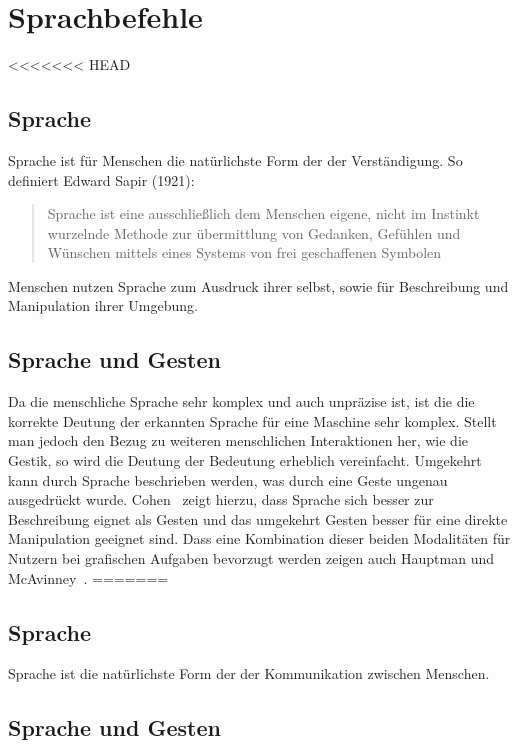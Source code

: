 \chapter{Sprachbefehle}
\label{chap:Sprachbefehle}

<<<<<<< HEAD
\section{Sprache}

Sprache ist f\"ur Menschen die nat\"urlichste Form der der Verst\"andigung. So definiert Edward Sapir (1921): 
\begin{quote}
Sprache ist eine ausschlie\ss lich dem Menschen eigene, nicht im Instinkt wurzelnde Methode zur \"ubermittlung von 
Gedanken, Gef\"uhlen und W\"unschen mittels eines Systems von frei geschaffenen Symbolen\footnotemark[1]
\end{quote}
Menschen nutzen Sprache zum Ausdruck ihrer selbst, sowie f\"ur Beschreibung und Manipulation ihrer Umgebung.


\section{Sprache und Gesten}

Da die menschliche Sprache sehr komplex und auch unpr\"azise ist, ist die die korrekte Deutung der erkannten Sprache f\"ur eine Maschine sehr komplex.
Stellt man jedoch den Bezug zu weiteren menschlichen Interaktionen her, wie die Gestik, so wird die Deutung der Bedeutung erheblich vereinfacht.
Umgekehrt kann durch Sprache beschrieben werden, was durch eine Geste ungenau ausgedr\"uckt wurde.
Cohen~\cite{bib:cohen1,bib:cohen2} zeigt hierzu, dass Sprache sich besser zur Beschreibung eignet als Gesten und das umgekehrt Gesten besser f\"ur
eine direkte Manipulation geeignet sind.
Dass eine Kombination dieser beiden Modalit\"aten f\"ur Nutzern bei grafischen Aufgaben bevorzugt werden zeigen auch Hauptman und McAvinney~\cite{bib:hauptmann}.
=======

\section{Sprache}

Sprache ist die nat\"urlichste Form der der Kommunikation zwischen Menschen. 

\section{Sprache und Gesten}

